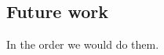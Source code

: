 \documentclass[11pt]{amsart}
\theoremstyle{definition}
\theoremstyle{remark}
\begin{document}
\subsection{Future work}
\label{sec:future}
In the order we would do them.
\end{document}
